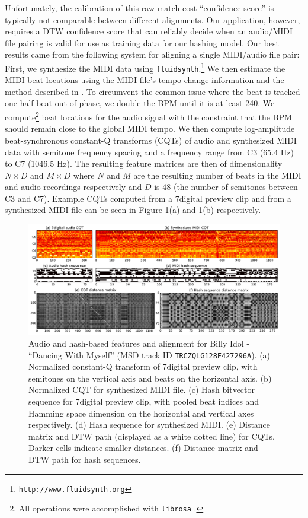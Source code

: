 \documentclass{article}
\begin{document}
Unfortunately, the calibration of this raw match cost ``confidence score'' is typically not comparable between different alignments.  
Our application, however, requires a DTW confidence score that can reliably decide when an audio/MIDI file pairing is valid for use as training data for our hashing model.
Our best results came from the following system for aligning a single MIDI/audio file pair:
First, we synthesize the MIDI data using \texttt{fluidsynth}.\footnote{\texttt{http://www.fluidsynth.org}}
We then estimate the MIDI beat locations using the MIDI file's tempo change information and the method described in \cite{raffel2014pretty_midi}.
To circumvent the common issue where the beat is tracked one-half beat out of phase, we double the BPM until it is at least 240.
We compute\footnote{All operations were accomplished with \texttt{librosa} \cite{mcfee2014librosa}.} beat locations for the audio signal with the constraint that the BPM should remain close to the global MIDI tempo. 
We then compute log-amplitude beat-synchronous constant-Q transforms (CQTs) of audio and synthesized MIDI data with semitone frequency spacing and a frequency range from C3 (65.4 Hz) to C7 (1046.5 Hz).
The resulting feature matrices are then of dimensionality $N \times D$ and $M \times D$ where $N$ and $M$ are the resulting number of beats in the MIDI and audio recordings respectively and $D$ is $48$ (the number of semitones between C3 and C7).
Example CQTs computed from a 7digital preview clip and from a synthesized MIDI file can be seen in Figure \ref{fig:simdtw}(a) and \ref{fig:simdtw}(b) respectively.

\begin{figure}
  \includegraphics[width=\textwidth]{sims_and_dtws.pdf}
  \caption{Audio and hash-based features and alignment for Billy Idol - ``Dancing With Myself'' (MSD track ID \texttt{TRCZQLG128F427296A}).
           (a) Normalized constant-Q transform of 7digital preview clip, with semitones on the vertical axis and beats on the horizontal axis.
	   (b) Normalized CQT for synthesized MIDI file.
	   (c) Hash bitvector sequence for 7digital preview clip, with pooled beat indices and Hamming space dimension on the horizontal and vertical axes respectively.
	   (d) Hash sequence for synthesized MIDI.
	   (e) Distance matrix and DTW path (displayed as a white dotted line) for CQTs.  Darker cells indicate smaller distances.
	   (f) Distance matrix and DTW path for hash sequences.}
  \label{fig:simdtw}
\end{figure}
\end{document}
